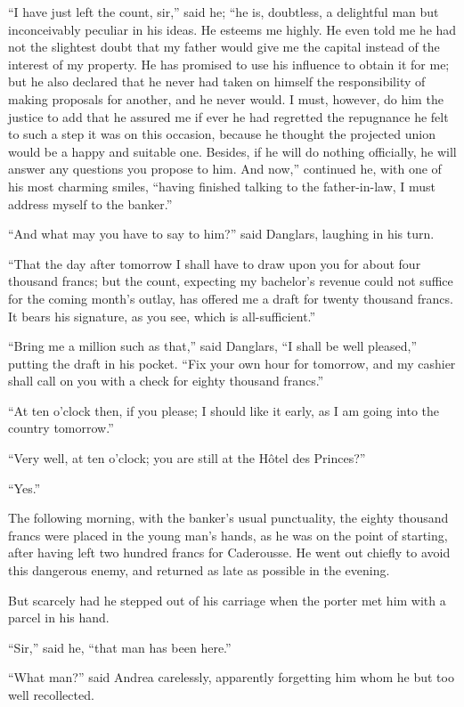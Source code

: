 “I have just left the count, sir,” said he; “he is, doubtless, a
delightful man but inconceivably peculiar in his ideas. He esteems me
highly. He even told me he had not the slightest doubt that my father
would give me the capital instead of the interest of my property. He
has promised to use his influence to obtain it for me; but he also
declared that he never had taken on himself the responsibility of
making proposals for another, and he never would. I must, however, do
him the justice to add that he assured me if ever he had regretted the
repugnance he felt to such a step it was on this occasion, because he
thought the projected union would be a happy and suitable one. Besides,
if he will do nothing officially, he will answer any questions you
propose to him. And now,” continued he, with one of his most charming
smiles, “having finished talking to the father-in-law, I must address
myself to the banker.”

“And what may you have to say to him?” said Danglars, laughing in his
turn.

“That the day after tomorrow I shall have to draw upon you for about
four thousand francs; but the count, expecting my bachelor’s revenue
could not suffice for the coming month’s outlay, has offered me a draft
for twenty thousand francs. It bears his signature, as you see, which
is all-sufficient.”

“Bring me a million such as that,” said Danglars, “I shall be well
pleased,” putting the draft in his pocket. “Fix your own hour for
tomorrow, and my cashier shall call on you with a check for eighty
thousand francs.”

“At ten o’clock then, if you please; I should like it early, as I am
going into the country tomorrow.”

“Very well, at ten o’clock; you are still at the Hôtel des Princes?”

“Yes.”

The following morning, with the banker’s usual punctuality, the eighty
thousand francs were placed in the young man’s hands, as he was on the
point of starting, after having left two hundred francs for Caderousse.
He went out chiefly to avoid this dangerous enemy, and returned as late
as possible in the evening.

But scarcely had he stepped out of his carriage when the porter met him
with a parcel in his hand.

“Sir,” said he, “that man has been here.”

“What man?” said Andrea carelessly, apparently forgetting him whom he
but too well recollected.

